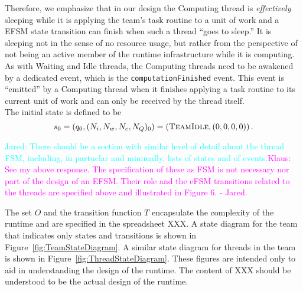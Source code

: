 \documentclass{article}
\newcommand{\TeamIdle}          {\textsc{TeamIdle}}
\newcommand{\Jared}[1]          {\textcolor{cyan}{Jared: #1}}
\newcommand{\KlausRfromJO}[1]   {\textcolor{magenta}{Klaus: #1 - Jared.}}
\newcommand{\taskroutine}        {task routine\xspace}
\begin{document}
Therefore, we emphasize that in our design the Computing thread is
\textit{effectively} sleeping while it is applying the team's \taskroutine to a unit of
work and a EFSM state transition can finish when such a thread ``goes to
sleep.''  It is sleeping not in the sense of no resource usage, but rather from
the perspective of not being an active member of the runtime infrastructure
while it is computing.  As with Waiting and Idle threads, the Computing threads
need to be awakened by a dedicated event, which is the
\texttt{computationFinished} event.  This event is ``emitted'' by a Computing
thread when it finishes applying a \taskroutine to its current unit of work and can only
be received by the thread itself.\\

The initial state is defined to be
\[
s_0 = \left(q_0, (N_i, N_w, N_c, N_Q)_0\right) = \left(\TeamIdle, (0, 0, 0, 0)\right).
\]

\Jared{There should be a section with similar level of detail about the
thread FSM, including, in partuclar and minimally, lists of states and
of events.}\KlausRfromJO{See my above response.  The specification of these as
FSM is not necessary nor part of the design of an EFSM.  Their role and the eFSM
transitions related to the threads are specified above and illustrated in Figure
6.}

The set $O$ and the transition function $T$ encapsulate the complexity of the
runtime and are specified in the spreadsheet XXX.  A state diagram for the team
that indicates only states and transitions is shown in
Figure~\ref{fig:TeamStateDiagram}.  A similar state diagram for threads in the
team is shown in Figure~\ref{fig:ThreadStateDiagram}.  These figures are
intended only to aid in understanding the design of the runtime.  The content of
XXX should be understood to be the actual design of the runtime.\\
\end{document}
